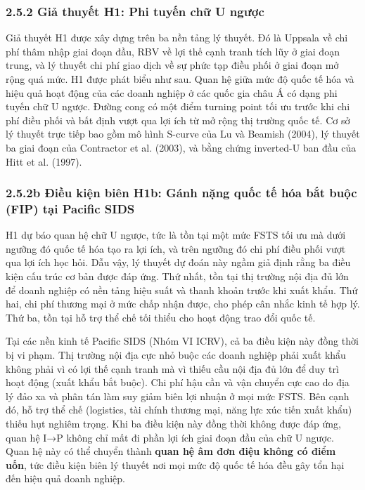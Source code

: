 \documentclass[12pt,a4paper]{article}
\begin{document}
\hypertarget{252-giux1ea3-thuyux1ebft-h1-phi-tuyux1ebfn-chux1eef-u-ngux1b0ux1ee3c}{%
\subsubsection{2.5.2 Giả thuyết H1: Phi tuyến chữ U
ngược}\label{252-giux1ea3-thuyux1ebft-h1-phi-tuyux1ebfn-chux1eef-u-ngux1b0ux1ee3c}}

Giả thuyết H1 được xây dựng trên ba nền tảng lý thuyết. Đó là Uppsala về
chi phí thâm nhập giai đoạn đầu, RBV về lợi thế cạnh tranh tích lũy ở
giai đoạn trung, và lý thuyết chi phí giao dịch về sự phức tạp điều phối
ở giai đoạn mở rộng quá mức. H1 được phát biểu như sau. Quan hệ giữa mức
độ quốc tế hóa và hiệu quả hoạt động của các doanh nghiệp ở các quốc gia
châu Á có dạng phi tuyến chữ U ngược. Đường cong có một điểm turning
point tối ưu trước khi chi phí điều phối và bất định vượt qua lợi ích từ
mở rộng thị trường quốc tế. Cơ sở lý thuyết trực tiếp bao gồm mô hình
S-curve của Lu và Beamish (2004), lý thuyết ba giai đoạn của Contractor
et al. (2003), và bằng chứng inverted-U ban đầu của Hitt et al. (1997).

\hypertarget{252b-ux111iux1ec1u-kiux1ec7n-biuxean-h1b-guxe1nh-nux1eb7ng-quux1ed1c-tux1ebf-huxf3a-bux1eaft-buux1ed9c-fip-tux1ea1i-pacific-sids}{%
\subsubsection{2.5.2b Điều kiện biên H1b: Gánh nặng quốc tế hóa bắt buộc
(FIP) tại Pacific
SIDS}\label{252b-ux111iux1ec1u-kiux1ec7n-biuxean-h1b-guxe1nh-nux1eb7ng-quux1ed1c-tux1ebf-huxf3a-bux1eaft-buux1ed9c-fip-tux1ea1i-pacific-sids}}

H1 dự báo quan hệ chữ U ngược, tức là tồn tại một mức FSTS tối ưu mà
dưới ngưỡng đó quốc tế hóa tạo ra lợi ích, và trên ngưỡng đó chi phí
điều phối vượt qua lợi ích học hỏi. Dẫu vậy, lý thuyết dự đoán này ngầm
giả định rằng ba điều kiện cấu trúc cơ bản được đáp ứng. Thứ nhất, tồn
tại thị trường nội địa đủ lớn để doanh nghiệp có nền tảng hiệu suất và
thanh khoản trước khi xuất khẩu. Thứ hai, chi phí thương mại ở mức chấp
nhận được, cho phép cân nhắc kinh tế hợp lý. Thứ ba, tồn tại hỗ trợ thể
chế tối thiểu cho hoạt động trao đổi quốc tế.

Tại các nền kinh tế Pacific SIDS (Nhóm VI ICRV), cả ba điều kiện này
đồng thời bị vi phạm. Thị trường nội địa cực nhỏ buộc các doanh nghiệp
phải xuất khẩu không phải vì có lợi thế cạnh tranh mà vì thiếu cầu nội
địa đủ lớn để duy trì hoạt động (xuất khẩu bắt buộc). Chi phí hậu cần và
vận chuyển cực cao do địa lý đảo xa và phân tán làm suy giảm biên lợi
nhuận ở mọi mức FSTS. Bên cạnh đó, hỗ trợ thể chế (logistics, tài chính
thương mại, năng lực xúc tiến xuất khẩu) thiếu hụt nghiêm trọng. Khi ba
điều kiện này đồng thời không được đáp ứng, quan hệ I→P không chỉ mất đi
phần lợi ích giai đoạn đầu của chữ U ngược. Quan hệ này có thể chuyển
thành \textbf{quan hệ âm đơn điệu không có điểm uốn}, tức điều kiện biên
lý thuyết nơi mọi mức độ quốc tế hóa đều gây tổn hại đến hiệu quả doanh
nghiệp.
\end{document}
